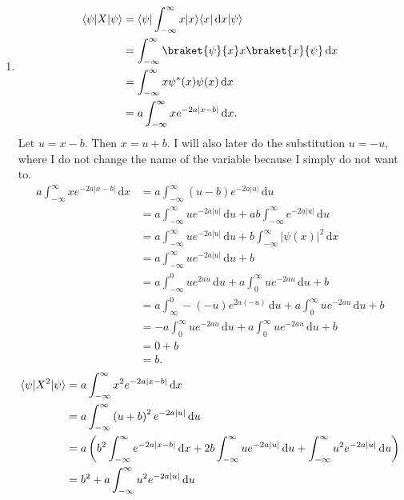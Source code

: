 \documentclass[11pt, letterpaper]{article}
\begin{document}
\begin{enumerate}
	\item 
		\begin{align*}
			\bra{\psi } X\ket{\psi } &=\bra{\psi } \int_{-\infty }^{\infty } x\ket{x} \bra{x}  \,\mathrm{d} x\ket{\psi } \\
						 &=\int_{-\infty }^{\infty } \braket{\psi }{x} x\braket{x}{\psi }  \,\mathrm{d} x\\
						 &=\int_{-\infty }^{\infty }x \psi ^*(x)\psi (x) \,\mathrm{d} x\\
						 &=a\int_{-\infty }^{\infty } xe^{-2a|x-b|} \,\mathrm{d} x
		.\end{align*}
		Let $u=x-b$. Then $x=u+b$. I will also later do the substitution $u=-u$, where I do not change the name of the variable because I simply do not want to.
		\begin{align*}
			a\int_{-\infty }^{\infty } xe^{-2a|x-b|}  \,\mathrm{d} x&=a\int_{-\infty }^{\infty } (u-b)e^{-2a|u|}  \,\mathrm{d} u\\
										&=a\int_{-\infty }^{\infty } ue^{-2a|u|}  \,\mathrm{d} u+ab\int_{-\infty }^{\infty } e^{-2a|u|}  \,\mathrm{d} u\\
										&=a\int_{-\infty }^{\infty } ue^{-2a|u|}  \,\mathrm{d} u+b\int_{-\infty }^{\infty } \left| \psi (x) \right| ^2 \,\mathrm{d} x\\
										&=a\int_{-\infty }^{\infty } ue^{-2a|u|}  \,\mathrm{d} u+b\\
										&=a\int_{-\infty }^{0} ue^{2au}  \,\mathrm{d} u+a\int_{0}^{\infty } ue^{-2au}  \,\mathrm{d} u+b\\
										&=a\int_{\infty }^{0} -(-u)e^{2a(-u)}  \,\mathrm{d} u+a\int_{0}^{\infty } ue^{-2au}  \,\mathrm{d} u+b\\
										&=-a\int_{0}^{\infty } ue^{-2au}  \,\mathrm{d} u+a\int_{0}^{\infty } ue^{-2au}  \,\mathrm{d} u+b\\
										&=0+b\\
										&=b
		.\end{align*}
		\begin{align*}
			\bra{\psi } X^2\ket{\psi } &=a\int_{-\infty }^{\infty } x^2e^{-2a|x-b|}  \,\mathrm{d} x\\
						   &=a\int_{-\infty }^{\infty } \left( u+b \right) ^2 e^{-2a|u|}  \,\mathrm{d} u\\
						   &=a\left( b^2\int_{-\infty }^{\infty } e^{-2a|x-b|}  \,\mathrm{d} x+2b\int_{-\infty }^{\infty } ue^{-2a|u|}  \,\mathrm{d} u+\int_{-\infty }^{\infty } u^2e^{-2a|u|}  \,\mathrm{d} u \right) \\
						   &=b^2+a\int_{-\infty }^{\infty } u^2e^{-2a|u|}  \,\mathrm{d} u\\

\end{align*}
\end{enumerate}
\end{document}
